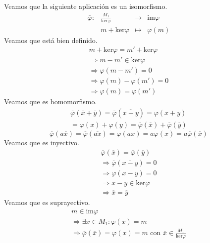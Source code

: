 \documentclass{article}
\begin{document}
\begin{multicols}{2}
\section{}
\noindent Veamos que la siguiente aplicación es un isomorfismo.
$$
\begin{array}{crcl}
\overline{\varphi} : & \frac{M_1}{\text{ker}\varphi} & \longrightarrow & \text{im}\varphi \\
& m+\text{ker}\varphi & \longmapsto     & \varphi(m)
\end{array}
$$
Veamos que está bien definido.
$$
\begin{array}{c}
m+\text{ker}\varphi=m'+\text{ker}\varphi \\
\Rightarrow m-m'\in\text{ker}\varphi \\
\Rightarrow \varphi(m-m')=0 \\
\Rightarrow \varphi(m)-\varphi(m')=0 \\
\Rightarrow \varphi(m)=\varphi(m')
\end{array}
$$
Veamos que es homomorfismo.
$$
\begin{array}{c}
    \overline{\varphi}(\overline{x}+\overline{y}) = \overline{\varphi}(\overline{x+y}) = \varphi(x+y) \\
    = \varphi(x)+\varphi(y) = \overline{\varphi}(\overline{x})+\overline{\varphi}(\overline{y})
\end{array}
$$
$$
\overline{\varphi}(a\overline{x}) = \overline{\varphi}(\overline{ax}) = \varphi(ax) = a\varphi(x) = a\overline{\varphi}(\overline{x})
$$
Veamos que es inyectivo.
$$
\begin{array}{c}
    \overline{\varphi}(\overline{x}) = \overline{\varphi}(\overline{y}) \\
    \Rightarrow \overline{\varphi}(\overline{x-y}) = 0 \\
    \Rightarrow \varphi(x-y) = 0 \\
    \Rightarrow x-y\in\text{ker}\varphi \\
    \Rightarrow \overline{x} = \overline{y}
\end{array}
$$
Veamos que es suprayectivo.
$$
\begin{array}{c}
    m\in \text{im}\varphi \\
    \Rightarrow \exists x\in M_1 : \varphi(x)=m \\
    \Rightarrow \overline{\varphi}(\overline{x}) = \varphi(x)=m \text{ con } \overline{x}\in\frac{M_1}{\text{ker}\varphi}
\end{array}
$$

\end{multicols}
\end{document}
